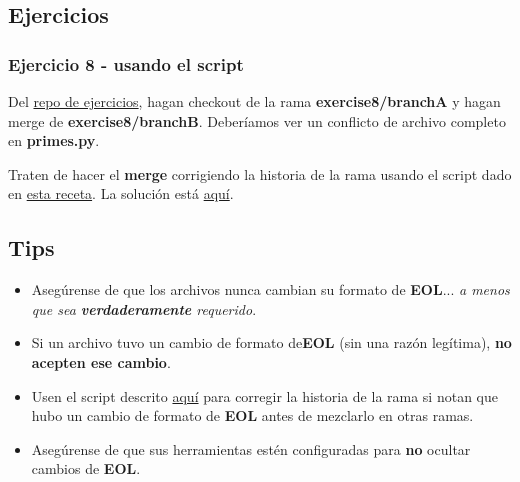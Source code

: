 \subsection{Ejercicios}
\subsubsection{Ejercicio 8 - usando el script}
 
Del \hyperref[exercises_repo]{repo de ejercicios}, hagan checkout de la rama {\bf exercise8/branchA} y hagan merge de {\bf exercise8/branchB}.
Deberíamos ver un conflicto de archivo completo en {\bf primes.py}.

Traten de hacer el {\bf merge} corrigiendo la historia de la rama usando el script dado en \hyperref[correct_eol_history]{esta receta}.
La solución está \hyperref[exercise08]{aquí}.

\subsection{Tips}
\begin{itemize}
	\item Asegúrense de que los archivos nunca cambian su formato de {\bf EOL}... {\it a menos que sea {\bf verdaderamente} requerido}.
	\item Si un archivo tuvo un cambio de formato de{\bf EOL} (sin una razón legítima), {\bf no acepten ese cambio}.
	\item Usen el script descrito \hyperref[correct_eol_history]{aquí} para corregir la historia de la rama si notan que hubo un cambio
	de formato de {\bf EOL} antes de mezclarlo en otras ramas.
	\item Asegúrense de que sus herramientas estén configuradas para {\bf no} ocultar cambios de {\bf EOL}.
\end{itemize}

